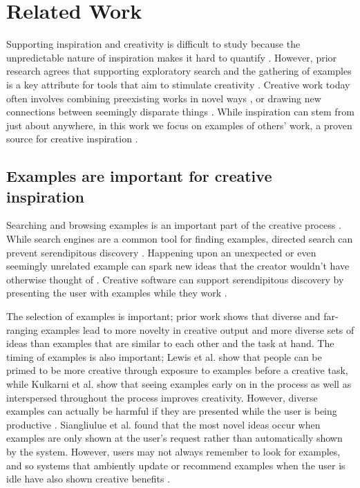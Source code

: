 \section{Related Work}
Supporting inspiration and creativity is difficult to study because the unpredictable nature of inspiration makes it hard to quantify \cite{Shneiderman2007}. However, prior research agrees that supporting exploratory search and the gathering of examples is a key attribute for tools that aim to stimulate creativity \cite{Shneiderman2007, Shneiderman2002, Muller-Wienbergen2011, Greene2002, Bawden1986}. Creative work today often involves combining preexisting works in novel ways \cite{Benjamin2014}, or drawing new connections between seemingly disparate things \cite{Foster2003}. While inspiration can stem from just about anywhere, in this work we focus on examples of others' work, a proven source for creative inspiration \cite{Benjamin2014, Foster2003}.

\subsection{Examples are important for creative inspiration}
Searching and browsing examples is an important part of the creative process \cite{Shneiderman2002, Shneiderman2007, Greene2002, Herring2009, Muller-Wienbergen2011, Bawden1986}. 
While search engines are a common tool for finding examples, directed search can prevent serendipitous discovery \cite{Benjamin2014}. Happening upon an unexpected or even seemingly unrelated example can spark new ideas that the creator wouldn't have otherwise thought of \cite{Erdelez1999, Benjamin2014}.
Creative software can support serendipitous discovery by presenting the user with examples while they work \cite{Bawden1986, Kulkarni2014, Herring2009}.

The selection of examples is important; prior work shows that diverse and far-ranging examples lead to more novelty in creative output \cite{Chan2011} and more diverse sets of ideas \cite{Siangliulue2015a} than examples that are similar to each other and the task at hand. The timing of examples is also important; Lewis et al. \cite{Lewis2011} show that people can be primed to be more creative through exposure to examples before a creative task, while Kulkarni et al. \cite{Kulkarni2014} show that seeing examples early on in the process as well as interspersed throughout the process improves creativity. However, diverse examples can actually be harmful if they are presented while the user is being productive \cite{Chan2017}. Siangliulue et al. \cite{Siangliulue2015} found that the most novel ideas occur when examples are only shown at the user's request rather than automatically shown by the system. However, users may not always remember to look for examples, and so systems that ambiently update or recommend examples when the user is idle have also shown creative benefits \cite{Siangliulue2015, Rhodes1996}.

